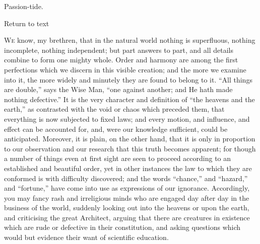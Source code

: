 
Passion-tide.

Return to text


W\textsc{e} know, my brethren, that in the natural world nothing is
superfluous, nothing incomplete, nothing independent; but part answers
to part, and all details combine to form one mighty whole. Order and
harmony are among the first perfections which we discern in this
visible creation; and the more we examine into it, the more widely and
minutely they are found to belong to it. ``All things are
double,'' says the Wise Man, ``one against another; and He
hath made nothing defective.'' It is the very character and
definition of ``the heavens and the earth,'' as contrasted
with the void or chaos which preceded them, that everything is now
subjected to fixed laws; and every motion, and influence, and effect
can be accounted for, and, were our knowledge sufficient, could be
anticipated. Moreover, it is plain, on the other hand, that it is only
in proportion to our observation and our research that this truth
becomes apparent; for though a number of things even at first sight
are seen to proceed according to an established and beautiful order,
yet in other instances the law to which they are conformed is with
difficulty discovered; and the words ``chance,'' and
``hazard,'' and ``fortune,'' have come into use as
expressions of our ignorance. Accordingly, you may fancy rash and
irreligious minds who are engaged day after day in the business of the
world, suddenly looking out into the heavens or upon the earth, and
criticising the great Architect, arguing that there are creatures in
existence which are rude or defective in their constitution, and
asking questions which would but evidence their want of scientific
education.

